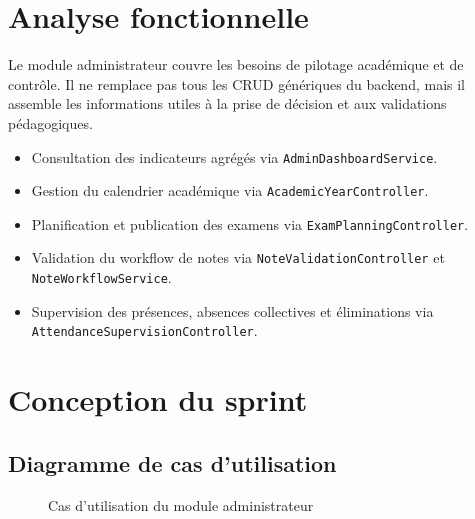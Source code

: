 \documentclass[12pt,a4paper]{report}
\begin{document}
\section{Analyse fonctionnelle}

Le module administrateur couvre les besoins de pilotage académique et de contrôle. Il ne remplace pas tous les CRUD génériques du backend, mais il assemble les informations utiles à la prise de décision et aux validations pédagogiques.

\begin{itemize}[itemsep=0.4em]
    \item Consultation des indicateurs agrégés via \texttt{AdminDashboardService}.
    \item Gestion du calendrier académique via \texttt{AcademicYearController}.
    \item Planification et publication des examens via \texttt{ExamPlanningController}.
    \item Validation du workflow de notes via \texttt{NoteValidationController} et \texttt{NoteWorkflowService}.
    \item Supervision des présences, absences collectives et éliminations via \texttt{AttendanceSupervisionController}.
\end{itemize}

\section{Conception du sprint}

\subsection*{Diagramme de cas d'utilisation}

\begin{figure}[H]
\centering
{}
\caption{Cas d'utilisation du module administrateur}
\label{fig:sprint2-usecase}
\end{figure}
\end{document}
